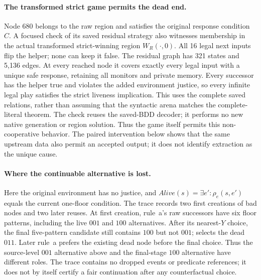 \paragraph{The transformed strict game permits the dead end.}
Node 680 belongs to the raw region and satisfies the original
response condition $C$. A focused check of its saved residual strategy
also witnesses membership in the actual transformed strict-winning
region $W_R(\cdot,0)$. All 16 legal next inputs flip the helper;
none can keep it false. The residual graph has 321 states and
5,136 edges. At every reached node it covers exactly every legal
input with a unique safe response, retaining all monitors and private
memory. Every successor has the helper true and violates the added
environment justice, so every infinite legal play satisfies the strict
liveness implication. This uses the complete saved relations, rather
than assuming that the syntactic arena matches the complete-literal
theorem. The check reuses the saved-BDD decoder; it performs no new
native generation or region solution.
Thus the game itself permits this non-cooperative behavior. The paired
intervention below shows that the same upstream data also permit an
accepted output; it does not identify extraction as the unique cause.

\paragraph{Where the continuable alternative is lost.}
Here the original environment has no justice, and
$\mathit{Alive}(s)=\exists e':\rho_e(s,e')$ equals the current one-floor
condition. The trace records two first creations of bad nodes and two
later reuses. At first creation, rule~a's raw successors have six floor
patterns, including the live $001$ and $100$ alternatives. After its
nearest-$Y$ choice, the final five-pattern candidate still contains
$100$ but not $001$;  selects the dead $011$.
Later rule~a prefers the existing dead node before the final choice.
Thus the source-level $001$ alternative above and the final-stage $100$
alternative have different roles. The trace contains no dropped events
or predicate references; it does not by itself certify a fair
continuation after any counterfactual choice.

